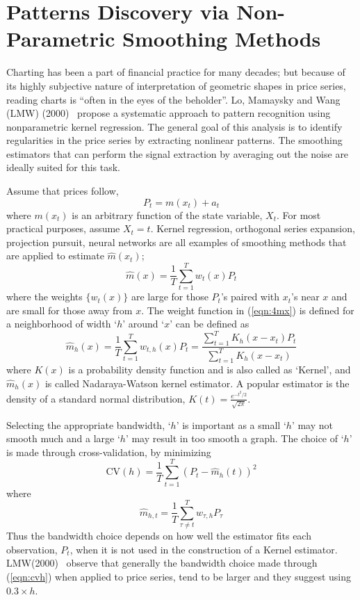 \section{Patterns Discovery via Non-Parametric Smoothing Methods}


Charting has been a part of financial practice for many decades; but because of its highly subjective nature of interpretation of geometric shapes in price series, reading charts is ``often in the eyes of the beholder''. Lo, Mamaysky and Wang (LMW) (2000)~\cite{LoMWang} propose a systematic approach to pattern recognition using nonparametric kernel regression. The general goal of this analysis is to identify regularities in the price series by extracting nonlinear patterns. The smoothing estimators that can perform the signal extraction by averaging out the noise are ideally suited for this task.	


Assume that prices follow,
	\begin{equation} \label{eqn:4pt}
	P_{t} = m(x_{t}) + a_{t}
	\end{equation}
where $m(x_{t})$ is an arbitrary function of the state variable, $X_{t}$. For most practical purposes, assume $X_{t}= t$. Kernel regression, orthogonal series expansion, projection pursuit, neural networks are all examples of smoothing methods that are applied to estimate $\hat{m}(x_{t})$;
	\begin{equation}\label{eqn:4mx}
	\hat{m}(x) = \frac{1}{T}\sum_{t=1}^Tw_{t}(x)P_{t}
	\end{equation}
where the weights $\{w_{t}(x)\}$ are large for those $P_{t}$'s paired with $x_{t}$'s near $x$ and are small for those away from $x$. The weight function in (\ref{eqn:4mx}) is defined for a neighborhood of width `$h$'  around `$x$' can be defined as
	\begin{equation}\label{eqn:3mhat}
	\hat{m}_{h}(x) = \frac{1}{T}\sum_{t=1}^T w_{t,h}(x)P_{t} = \dfrac{\sum_{t=1}^T K_{h}(x-x_{t})P_{t}}{\sum_{t=1}^T K_{h}(x-x_{t})}
	\end{equation}
where $K(x)$ is a probability density function and is also called as `Kernel', and $\hat{m}_{h}(x)$ is called Nadaraya-Watson kernel estimator. A popular estimator is the density of a standard normal distribution, $K(t)=\frac{e^{-t^2/2}}{\sqrt{2\pi}}$.


Selecting the appropriate bandwidth, `$h$' is important as a small `$h$' may not smooth much and a large `$h$' may result in too smooth a graph. The choice of `$h$' is made through cross-validation, by minimizing
	\begin{equation}\label{eqn:cvh}
	\text{CV}(h) = \frac{1}{T}\sum_{t=1}^T (P_{t} - \hat{m}_{h}(t))^2
	\end{equation}
where
	\begin{equation}\label{eqn:mht}
	\hat{m}_{h,t} = \frac{1}{T}\sum_{\tau\not=t}^T w_{\tau,h}P_{\tau}
	\end{equation}
Thus the bandwidth choice depends on how well the estimator fits each observation, $P_{t}$, when it is not used in the construction of a Kernel estimator. LMW(2000)~\cite{LoMWang} observe that generally the bandwidth choice made through (\ref{eqn:cvh}) when applied to price series, tend to be larger and they suggest using $0.3\times h$.

